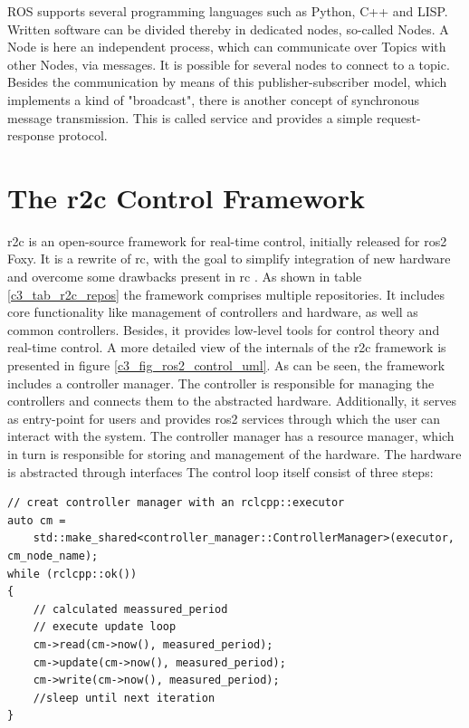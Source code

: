 ROS supports several programming languages such as Python, C++ and LISP. Written software can be divided thereby in dedicated nodes, so-called Nodes. A Node is here an independent process, which can communicate over Topics with other Nodes, via messages. It is possible for several nodes to connect to a topic. Besides the communication by means of this publisher-subscriber model, which implements a kind of "broadcast", there is another concept of synchronous message transmission. This is called service and provides a simple request-response protocol.







\section{The \gls{r2c} Control Framework}\label{ros2_control}
\Gls{r2c} is an open-source framework for real-time control, initially released for  \gls{ros2} Foxy. It is a rewrite of \gls{rc}, with the goal to simplify integration of new hardware and overcome some drawbacks present in \gls{rc} \cite{noauthor_welcome_nodate, magyar_getting_started_with_ros2_control_2021, magyar_ros2_control_the_future_of_ros_control_2021}. As shown in table \ref{c3_tab_r2c_repos} the framework comprises multiple repositories. It includes core functionality like management of controllers and hardware, as well as common controllers. Besides, it provides low-level tools for control theory and real-time control. \newline
A more detailed view of the internals of the \gls{r2c} framework is presented in figure \ref{c3_fig_ros2_control_uml}. As can be seen, the framework includes a controller manager. The controller is responsible for managing the controllers and connects them to the abstracted hardware. Additionally, it serves as entry-point for users and provides \gls{ros2} services through which the user can interact with the system. The controller manager has a resource manager, which in turn is responsible for storing and management of the hardware. The hardware is abstracted through interfaces \newline
The control loop itself consist of three steps:
\lstset{language=C++,basicstyle=\scriptsize}
\begin{lstlisting}[caption=Pseudo code for the control loop.]
// creat controller manager with an rclcpp::executor
auto cm = 
    std::make_shared<controller_manager::ControllerManager>(executor, cm_node_name);
while (rclcpp::ok())
{   
    // calculated meassured_period
    // execute update loop
    cm->read(cm->now(), measured_period);
    cm->update(cm->now(), measured_period);
    cm->write(cm->now(), measured_period);
    //sleep until next iteration
}
\end{lstlisting}\label{c3_code_control_loop}


